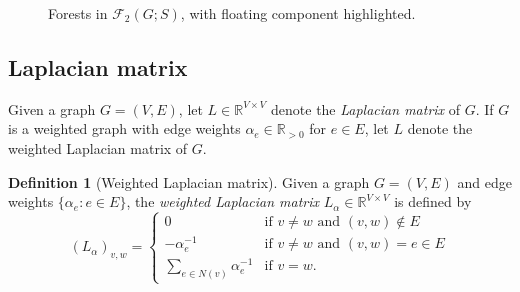 \documentclass{amsart}
\theoremstyle{definition}
\newtheorem{dfn}[thm]{Definition}
\newcommand{\RR}{\mathbb{R}}
\newcommand{\La}{L_{\alpha}}
\newcommand{\forests}{\mathcal{F}}
\begin{document}
\begin{figure}[h]
%	
%
%
\caption{Forests in $\forests_2(G;S)$, with floating component highlighted.}
\label{fig:2-forests}
\end{figure}


\subsection{Laplacian matrix}

Given a graph $G = (V,E)$, let $L \in \RR^{V \times V}$ denote the {\em Laplacian matrix} of $G$.
If $G$ is a weighted graph with edge weights $\alpha_e  \in \RR_{>0}$ for $e \in E$,
let $L$ denote the weighted Laplacian matrix of $G$.

\begin{dfn}[Weighted Laplacian matrix]
Given a graph $G = (V,E)$ and edge weights $\{ \alpha_e : e \in E\}$,
the {\em weighted Laplacian matrix} $\La \in \RR^{V\times V}$ is defined by
\[
	(\La)_{v,w} = \begin{cases}
		0 &\text{if } v\neq w \text{ and } (v,w) \not\in E \\
		- \alpha_e^{-1} &\text{if } v\neq w \text{ and } (v,w) = e \in E \\
		\displaystyle \sum_{e \in N(v)} \alpha_e^{-1} &\text{if } v = w.
	\end{cases}
\]
\end{dfn}
\end{document}
